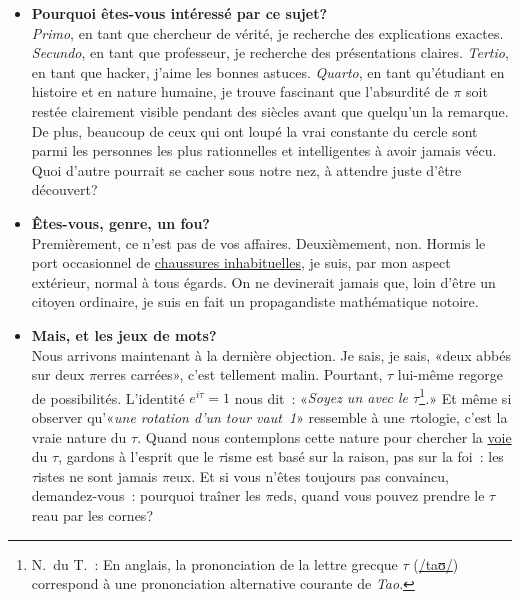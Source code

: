 \begin{itemize}
  \item \textbf{Pourquoi êtes-vous intéressé par ce sujet\ns?} \\ \emph{Primo}, en
  tant que chercheur de vérité, je recherche des explications exactes.
  \emph{Secundo}, en tant que professeur, je recherche des présentations
  claires. \emph{Tertio}, en tant que hacker, j'aime les bonnes astuces.
  \emph{Quarto}, en tant qu'étudiant en histoire et en nature humaine, je
  trouve fascinant que l'absurdité de $\pi$ soit restée clairement visible pendant des
  siècles avant que quelqu'un la remarque. De plus, beaucoup de ceux
  qui ont loupé la vrai constante du cercle sont parmi les personnes les plus
  rationnelles et intelligentes à avoir jamais vécu. Quoi d'autre pourrait se
  cacher sous notre nez, à attendre juste d'être découvert\ns?

  \item \textbf{Êtes-vous, genre, un fou\ns?} \\ Premièrement, ce n'est pas de vos
  affaires. Deuxièmement, non. Hormis le port occasionnel de
  \href{https://fr.wikipedia.org/wiki/Chaussure_à_orteils}{chaussures
  inhabituelles}, je suis, par mon aspect extérieur, normal à tous
  égards. On ne devinerait jamais que, loin d'être un citoyen ordinaire,
  je suis en fait un propagandiste mathématique notoire.

  \item \textbf{Mais, et les jeux de mots\ns?} \\ Nous arrivons
  maintenant à la dernière objection. Je sais, je sais,
  «\ns deux abbés sur deux $\pi$erres carrées\ns », c'est
  tellement malin. Pourtant, $\tau$ lui-même regorge de
  possibilités. L'identité $e^{i\tau} = 1$ nous
  dit~: «\ns \emph{Soyez un avec le $\tau$}\ns\footnote{N.\ du T.~: En anglais,
  la prononciation de la lettre grecque $\tau$
  (\href{https://fr.wikipedia.org/wiki/Alphabet_phonétique_international}{/taʊ/})
  correspond à une prononciation alternative courante de
  \emph{Tao}.}\emph{.}\ns » Et même si observer qu'«\ns \emph{une rotation d'un tour vaut~1}\ns »
  ressemble à une $\tau$tologie, c'est la vraie nature du $\tau$. Quand nous contemplons cette nature
  pour chercher la \href{https://fr.wikipedia.org/wiki/Tao_(culture)}{voie} du
  $\tau$, gardons à l'esprit que le $\tau$isme est basé sur la raison, pas
  sur la foi~: les $\tau$istes ne sont jamais $\pi$eux. Et si vous n'êtes
  toujours pas convaincu, demandez-vous~: pourquoi traîner les $\pi$eds, quand
  vous pouvez prendre le $\tau$reau par les cornes\ns ?

\end{itemize}

